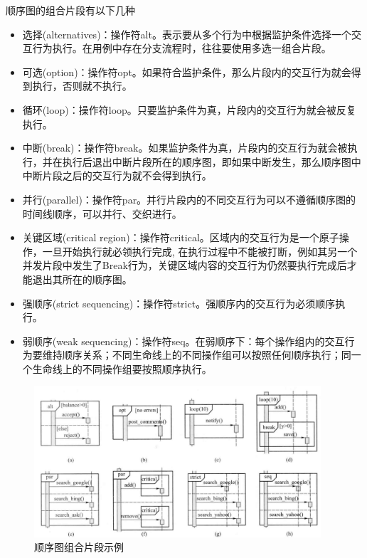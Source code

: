 顺序图的组合片段有以下几种
\begin{itemize}
    \item 选择(alternatives)：操作符alt。表示要从多个行为中根据监护条件选择一个交互行为执行。在用例中存在分支流程时，往往要使用多选一组合片段。
    \item 可选(option)：操作符opt。如果符合监护条件，那么片段内的交互行为就会得到执行，否则就不执行。
    \item 循环(loop)：操作符loop。只要监护条件为真，片段内的交互行为就会被反复执行。
    \item 中断(break)：操作符break。如果监护条件为真，片段内的交互行为就会被执行，并在执行后退出中断片段所在的顺序图，即如果中断发生，那么顺序图中中断片段之后的交互行为就不会得到执行。
    \item 并行(parallel)：操作符par。并行片段内的不同交互行为可以不遵循顺序图的时间线顺序，可以并行、交织进行。
    \item 关键区域(critical region)：操作符critical。区域内的交互行为是一个原子操作，一旦开始执行就必领执行完成, 在执行过程中不能被打断，例如其另一个并发片段中发生了Break行为，关键区域内容的交互行为仍然要执行完成后才能退出其所在的顺序图。
    \item 强顺序(strict sequencing)：操作符strict。强顺序内的交互行为必须顺序执行。
    \item 弱顺序(weak sequencing)：操作符seq。在弱顺序下：每个操作组内的交互行为要维持顺序关系；不同生命线上的不同操作组可以按照任何顺序执行；同一个生命线上的不同操作组要按照顺序执行。
\end{itemize}

\begin{figure}[H]
	\centering
    \vspace{-0.2em}
	\includegraphics[width=0.95\textwidth]{img/顺序图组合片段示例.png}
    \caption*{顺序图组合片段示例}
    \vspace{-1em}
\end{figure}


